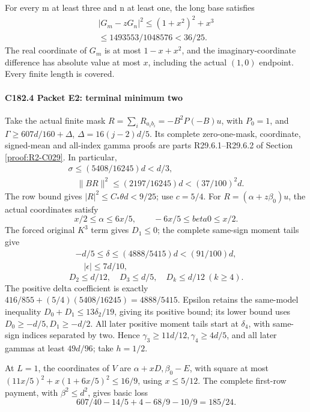 For every m at least three and n at least one, the long base satisfies
\[
\begin{gathered}
|G_m-zG_n|^2\le(1+x^2)^2+x^3\\
\le1493553/1048576<36/25.
\end{gathered}\tag{C182.21}
\]
The real coordinate of \(G_m\) is at most \(1-x+x^2\), and the imaginary-coordinate difference has absolute value at most \(x\), including the actual \((1,\allowbreak \allowbreak  0)\) endpoint. Every finite length is covered.


\paragraph{C182.4 Packet E2: terminal minimum two}

Take the actual finite mask \(R=\sum_iR_{a_ib_i}=-B^2P(-B)u\), with \(P_0=1\), and \(\Gamma\ge607d/160+\Delta\), \(\Delta=16(j-2)d/5\). Its complete zero-one-mask, coordinate, signed-mean and all-index gamma proofs are parts R29.6.1--R29.6.2 of Section \ref{proof:R2-C029}. In particular,
\[
\begin{gathered}
\sigma\le(5408/16245)d<d/3,\\
\quad\|BR\|^2\le(2197/16245)d<(37/100)^2d.
\end{gathered}\tag{C182.27}
\]
The row bound gives \(|R|^2\le C_*\theta d<9/25\); use \(c=5/4\). For \(R=(\alpha+z\beta_0)u\), the actual coordinates satisfy
\[
 x/2\le \alpha\le6x/5,\qquad -6x/5\le beta0\le x/2.
\]
The forced original \(K^3\) term gives \(D_1\le0\); the complete same-sign moment tails give
\[
\begin{gathered}
-d/5\le\delta\le(4888/5415)d<(91/100)d,\\
\quad |\epsilon|\le7d/10,
\end{gathered}\tag{C182.28}
\]
\[
 D_2\le d/12,\quad D_3\le d/5,\quad D_k\le d/12\ (k\ge4).
\]
The positive delta coefficient is exactly \(416/855+(5/4)(5408/16245)=4888/5415\). Epsilon retains the same-model inequality \(D_0+D_1\le13\delta_2/19\), giving its positive bound; its lower bound uses \(D_0\ge-d/5,\allowbreak \allowbreak  D_1\ge-d/2\). All later positive moment tails start at \(\delta_4\), with same-sign indices separated by two. Hence \(\gamma_3\ge11d/12,\allowbreak \allowbreak  \gamma_4\ge4d/5\), and all later gammas at least \(49d/96\); take \(h=1/2\).

At \(L=1\), the coordinates of \(V\) are \(\alpha+xD,\allowbreak \allowbreak  \beta_0-E\), with square at most \((11x/5)^2+x(1+6x/5)^2\le16/9\), using \(x\le5/12\). The complete first-row payment, with \(\beta^2\le d^2\), gives basic loss
\[
 607/40-14/5+4-68/9-10/9=185/24.                    \tag{C182.29}
\]


